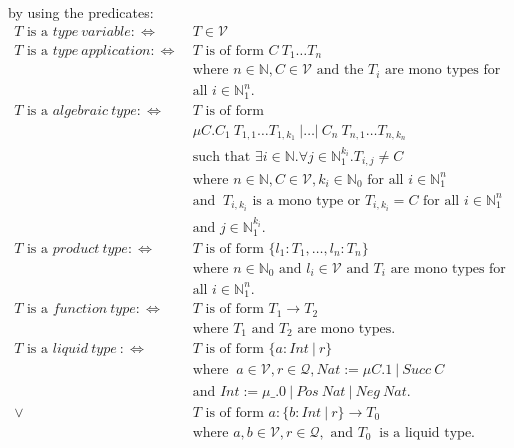 \documentclass[]{scrbook}
\theoremstyle{definition}
\theoremstyle{definition}
\theoremstyle{definition}
\theoremstyle{remark}
\begin{document}
by using the predicates: \[
\begin{aligned}
T \text{ is a } \mathit{type} \ \mathit{variable}:\Leftrightarrow \
         & T\in\mathcal{V}\\
T \text{ is a } \mathit{type} \ \mathit{application}:\Leftrightarrow \
         & T \text{ is of form } C \ T_1 \dots T_n\\
         & \text{where } n\in\mathbb{N}, C\in\mathcal{V} \text{ and the } T_i \text{ are mono types for}\\
         & \text{all } i\in\mathbb{N}_1^n.\\
T \text{ is a } \mathit{algebraic} \ \mathit{type}:\Leftrightarrow \
         & T \text{ is of form }\\
         & \mu C. C_1 \ T_{1,1} \dots T_{1,k_1} \ | \dots | \ C_n \ T_{n,1} \dots T_{n,k_n}\\
         & \text{such that }\exists i\in\mathbb{N}.\forall j\in\mathbb{N}_1^{k_i}.T_{i,j}\neq C\\
         & \text{where } n\in\mathbb{N}, C\in\mathcal{V} , k_i\in\mathbb{N}_0 \text{ for all } i\in\mathbb{N}_1^n \\
         & \text{and } \ T_{i,k_i} \text{ is a mono type or } T_{i,k_i} = C \text{ for all } i\in\mathbb{N}_1^n\\
         & \text{and } j\in\mathbb{N}_1^{k_i}.\\
T \text{ is a } \mathit{product} \ \mathit{type}:\Leftrightarrow \
         & T \text{ is of form } \{l_1:T_1,\dots,l_n:T_n\}\\
         & \text{where }n\in\mathbb{N}_0\text{ and } l_i\in\mathcal{V} \text{ and } T_i \text{ are mono types for}\\
         & \text{all } i\in\mathbb{N}_1^n.\\
T \text{ is a } \mathit{function} \ \mathit{type}:\Leftrightarrow \
         & T \text{ is of form } T_1 \to T_2\\
         & \text{where } T_1 \text{ and } T_2 \text{ are mono types}.\\
T \text{ is a }\mathit{liquid} \ \mathit{type} \ :\Leftrightarrow \ 
         & T \text{ is of form } \{ a :\mathit{Int} \ | \ r \}\\
         & \text{where } \ a \in\mathcal{V}, r\in \mathcal{Q},\mathit{Nat}:=\mu C. 1 \ | \ \mathit{Succ} \ C\\
&\text{and }\mathit{Int}:=\mu \_. 0 \ | \ \mathit{Pos} \ Nat \ | \ \mathit{Neg} \ \mathit{Nat}.\\
  \lor \ & T \text{ is of form } a:\{ b :\mathit{Int} \ | \ r \}\to T_0\\
         & \text{where } a,b \in\mathcal{V}, r\in \mathcal{Q}, \text{ and } T_0\ \text{ is a liquid type.}\\
\end{aligned}
\]
\EndKnitrBlock{definition}
\end{document}
